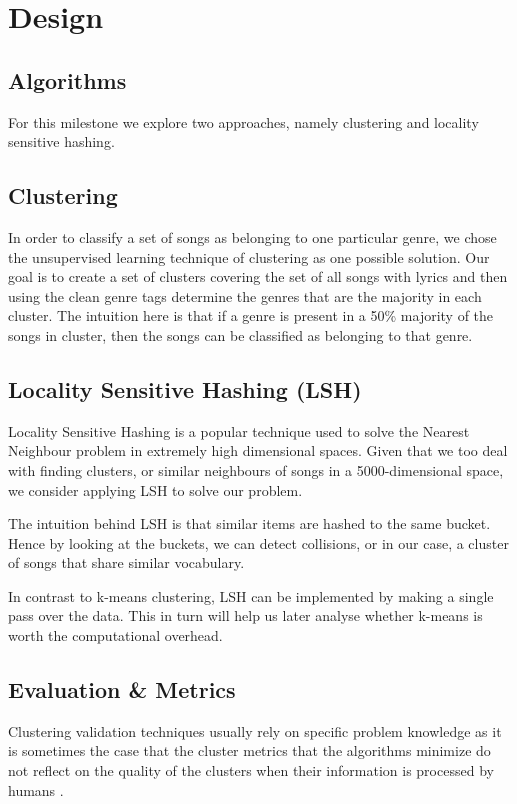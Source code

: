 \documentclass[10pt,a4paper]{scrartcl}
\begin{document}
  \section{Design}  
    \subsection{Algorithms}
      For this milestone we explore two approaches, namely clustering and
      locality sensitive hashing.
      \subsection{Clustering}
        In order to classify a set of songs as belonging to one particular
        genre, we chose the unsupervised learning technique of clustering
        as one possible solution.
        Our goal is to create a set of clusters covering the set of all songs
        with lyrics and then using the clean genre tags determine the genres
        that are the majority in each cluster.   
        The intuition here is that if a genre is present in a 50\% majority
        of the songs in cluster, then the songs can be classified as belonging
        to that genre.
      \subsection{Locality Sensitive Hashing (LSH)}
      Locality Sensitive Hashing is a popular technique used to solve the Nearest Neighbour problem in extremely high dimensional spaces.
      Given that we too deal with finding clusters, or similar neighbours of songs in a 5000-dimensional space, we consider applying LSH to solve our problem.
      
      The intuition behind LSH is that similar items are hashed to the same bucket.
      Hence by looking at the buckets, we can detect collisions, or in our case, a cluster of songs that share similar vocabulary.
      
      In contrast to k-means clustering, LSH can be implemented by making a single pass over the data.
      This in turn will help us later analyse whether k-means is worth the computational overhead.
    \subsection{Evaluation \& Metrics}
      Clustering validation techniques usually rely on specific problem
      knowledge as it is sometimes the case that the cluster metrics
      that the algorithms minimize do not reflect on the quality of the
      clusters when their information is processed by humans
      \cite{halkidi2001clustering}. 
      
\end{document}
